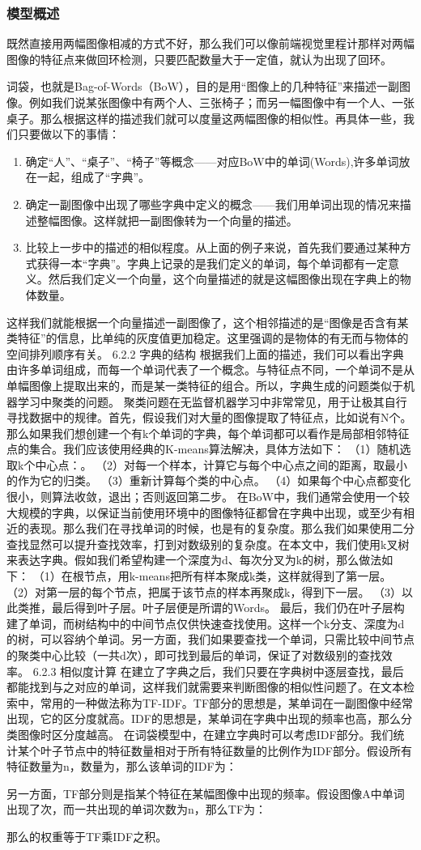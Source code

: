 \subsubsection{模型概述}
既然直接用两幅图像相减的方式不好，那么我们可以像前端视觉里程计那样对两幅图像的特征点来做回环检测，只要匹配数量大于一定值，就认为出现了回环。\par
词袋，也就是Bag-of-Words（BoW），目的是用“图像上的几种特征”来描述一副图像。例如我们说某张图像中有两个人、三张椅子；而另一幅图像中有一个人、一张桌子。那么根据这样的描述我们就可以度量这两幅图像的相似性。再具体一些，我们只要做以下的事情：
\begin{enumerate}
\item 确定“人”、“桌子”、“椅子”等概念——对应BoW中的单词(Words),许多单词放在一起，组成了“字典”。
\item 确定一副图像中出现了哪些字典中定义的概念——我们用单词出现的情况来描述整幅图像。这样就把一副图像转为一个向量的描述。
\item 比较上一步中的描述的相似程度。从上面的例子来说，首先我们要通过某种方式获得一本“字典”。字典上记录的是我们定义的单词，每个单词都有一定意义。然后我们定义一个向量，这个向量描述的就是这幅图像出现在字典上的物体数量。
\end{enumerate}

这样我们就能根据一个向量描述一副图像了，这个相邻描述的是“图像是否含有某类特征”的信息，比单纯的灰度值更加稳定。这里强调的是物体的有无而与物体的空间排列顺序有关。
6.2.2 字典的结构	
根据我们上面的描述，我们可以看出字典由许多单词组成，而每一个单词代表了一个概念。与特征点不同，一个单词不是从单幅图像上提取出来的，而是某一类特征的组合。所以，字典生成的问题类似于机器学习中聚类的问题。
聚类问题在无监督机器学习中非常常见，用于让极其自行寻找数据中的规律。首先，假设我们对大量的图像提取了特征点，比如说有N个。那么如果我们想创建一个有k个单词的字典，每个单词都可以看作是局部相邻特征点的集合。我们应该使用经典的K-means算法解决，具体方法如下：
（1）随机选取k个中心点：。
（2）对每一个样本，计算它与每个中心点之间的距离，取最小的作为它的归类。
（3）重新计算每个类的中心点。
（4）如果每个中心点都变化很小，则算法收敛，退出；否则返回第二步。
在BoW中，我们通常会使用一个较大规模的字典，以保证当前使用环境中的图像特征都曾在字典中出现，或至少有相近的表现。那么我们在寻找单词的时候，也是有的复杂度。那么我们如果使用二分查找显然可以提升查找效率，打到对数级别的复杂度。在本文中，我们使用k叉树来表达字典。假如我们希望构建一个深度为d、每次分叉为k的树，那么做法如下：
（1）在根节点，用k-means把所有样本聚成k类，这样就得到了第一层。
（2）对第一层的每个节点，把属于该节点的样本再聚成k，得到下一层。
（3）以此类推，最后得到叶子层。叶子层便是所谓的Words。
最后，我们仍在叶子层构建了单词，而树结构中的中间节点仅供快速查找使用。这样一个k分支、深度为d的树，可以容纳个单词。另一方面，我们如果要查找一个单词，只需比较中间节点的聚类中心比较（一共d次），即可找到最后的单词，保证了对数级别的查找效率。
6.2.3 相似度计算
在建立了字典之后，我们只要在字典树中逐层查找，最后都能找到与之对应的单词，这样我们就需要来判断图像的相似性问题了。在文本检索中，常用的一种做法称为TF-IDF。TF部分的思想是，某单词在一副图像中经常出现，它的区分度就高。IDF的思想是，某单词在字典中出现的频率也高，那么分类图像时区分度越高。
在词袋模型中，在建立字典时可以考虑IDF部分。我们统计某个叶子节点中的特征数量相对于所有特征数量的比例作为IDF部分。假设所有特征数量为n，数量为，那么该单词的IDF为：

另一方面，TF部分则是指某个特征在某幅图像中出现的频率。假设图像A中单词出现了次，而一共出现的单词次数为n，那么TF为：

那么的权重等于TF乘IDF之积。
